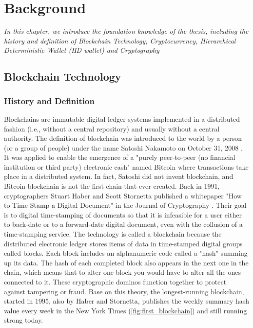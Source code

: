 \setlength{\abovedisplayskip}{0pt}
\setlength{\belowdisplayskip}{0pt}
\setlength{\abovedisplayshortskip}{0pt}
\setlength{\belowdisplayshortskip}{0pt}

\chapter{Background}
\label{chap:background}
\textit{In this chapter, we introduce the foundation knowledge of the thesis, including the history and definition of Blockchain Technology, Cryptocurrency,
  Hierarchical Deterministic Wallet (HD wallet) and Cryptography}
\minitoc

\section{Blockchain Technology}

\subsection{History and Definition}

Blockchains are immutable digital ledger systems implemented in a distributed fashion (i.e., without a central repository) and usually without a central authority.
The definition of blockchain was introduced to the world by a person (or a group of people) under the name Satoshi Nakamoto on October 31, 2008 \cite{Bitcoin:Bitcoin}.
It was applied to enable the emergence of a "purely peer-to-peer (no financial institution or third party) electronic cash" named Bitcoin where transactions take place in a distributed system.
In fact, Satoshi did not invent blockchain, and Bitcoin blockchain is not the first chain that ever created.
Back in 1991, cryptographers Stuart Haber and Scott Stornetta published a whitepaper "How to Time-Stamp a Digital Document" in the Journal of Cryptography \cite{DBLP:journals/joc/HaberS91}.
Their goal is to digital time-stamping of documents so that it is infeasible for a user either to back-date or to a forward-date digital document, even with the collusion of a time-stamping service.
The technology is called a blockchain because the distributed electronic ledger stores items of data in time-stamped digital groups called blocks. Each block includes an alphanumeric code called a "hash" summing up its data. The hash of each completed block also appears in the next one in the chain, which means that to alter one block you would have to alter all the ones connected to it. These cryptographic dominos function together to protect against tampering or fraud.
Base on this theory, the longest-running blockchain, started in 1995, also by Haber and Stornetta, publishes the weekly summary hash value every week in the New York Times (\autoref{fig:first_blockchain}) and still running strong today.

